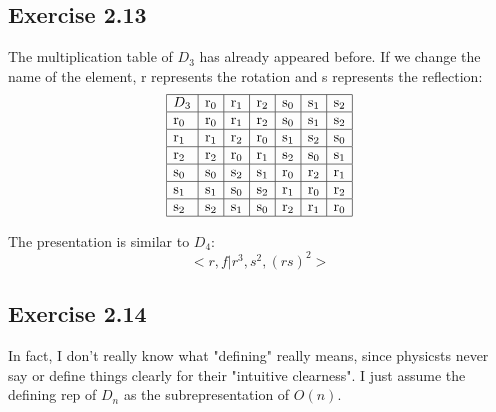 \documentclass[]{ctexart}
\begin{document}
    \subsection{Exercise 2.13}
    The multiplication table of $D_3$ has already appeared before. If we change the name of the element, r represents the rotation and s represents the reflection:
    \begin{equation*}
    	\begin{array}{|l|l|l|l|l|l|l|}
    	\hline D_3 & \mathrm{r}_{0} & \mathrm{r}_{1} & \mathrm{r}_{2} & \mathrm{s}_{0} & \mathrm{s}_{1} & \mathrm{s}_{2} \\
    	\hline \mathrm{r}_{0} & \mathrm{r}_{0} & \mathrm{r}_{1} & \mathrm{r}_{2} & \mathrm{s}_{0} & \mathrm{s}_{1} & \mathrm{s}_{2} \\
    	\hline \mathrm{r}_{1} & \mathrm{r}_{1} & \mathrm{r}_{2} & \mathrm{r}_{0} & \mathrm{s}_{1} & \mathrm{s}_{2} & \mathrm{s}_{0} \\
    	\hline \mathrm{r}_{2} & \mathrm{r}_{2} & \mathrm{r}_{0} & \mathrm{r}_{1} & \mathrm{s}_{2} & \mathrm{s}_{0} & \mathrm{s}_{1} \\
    	\hline \mathrm{s}_{0} & \mathrm{s}_{0} & \mathrm{s}_{2} & \mathrm{s}_{1} & \mathrm{r}_{0} & \mathrm{r}_{2} & \mathrm{r}_{1} \\
    	\hline \mathrm{s}_{1} & \mathrm{s}_{1} & \mathrm{s}_{0} & \mathrm{s}_{2} & \mathrm{r}_{1} & \mathrm{r}_{0} & \mathrm{r}_{2} \\
    	\hline \mathrm{s}_{2} & \mathrm{s}_{2} & \mathrm{s}_{1} & \mathrm{s}_{0} & \mathrm{r}_{2} & \mathrm{r}_{1} & \mathrm{r}_{0} \\
    	\hline
    	\end{array}
    \end{equation*}
    
    The presentation is similar to $D_4$:
    \begin{equation*}
    	<r,f|r^3,s^2,(rs)^2>
    \end{equation*}
    
    \subsection{Exercise 2.14}
    In fact, I don't really know what "defining" really means, since physicsts never say or define things clearly for their "intuitive clearness".  I just assume the defining rep of $D_n$ as the subrepresentation of $O(n)$.
    
\end{document}
